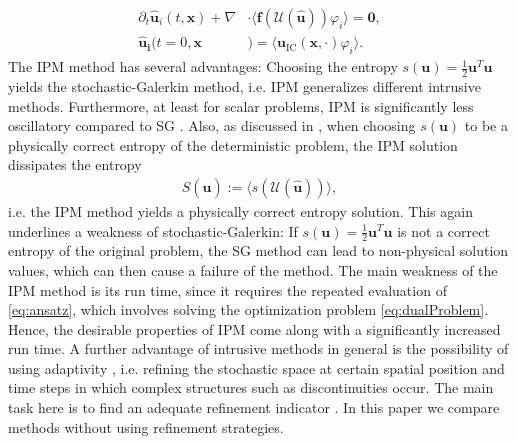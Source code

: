 \begin{subequations}\label{eq:IPMmomentSystem}
\begin{align}
\partial_t \bm{\hat u}_i(t,\bm{x}) + \nabla&\cdot\langle\bm{f}(\mathcal{U}(\bm{\hat u})) \varphi_i\rangle = \bm{0}, \\
\bm{\hat u_i}(t=0,\bm{x}&) = \langle\bm{u}_{\text{IC}}(\bm{x},\cdot)\varphi_i\rangle.
\end{align}
\end{subequations}
The IPM method has several advantages: Choosing the entropy $s(\bm{u}) = \frac{1}{2}\bm{u}^T\bm{u}$ yields the stochastic-Galerkin method, i.e. IPM generalizes different intrusive methods. Furthermore, at least for scalar problems, IPM is significantly less oscillatory compared to SG \cite{kusch2017maximum}. Also, as discussed in \cite{poette2009uncertainty}, when choosing $s(\bm u)$ to be a physically correct entropy of the deterministic problem, the IPM solution dissipates the entropy
\begin{align*}
S(\bm{\hat u}) := \langle s( \mathcal{U}(\bm{\hat u}))\rangle,
\end{align*}
i.e. the IPM method yields a physically correct entropy solution. This again underlines a weakness of stochastic-Galerkin: If $s(\bm{u}) = \frac{1}{2}\bm{u}^T\bm{u}$ is not a correct entropy of the original problem, the SG method can lead to non-physical solution values, which can then cause a failure of the method. The main weakness of the IPM method is its run time, since it requires the repeated evaluation of \eqref{eq:ansatz}, which involves solving the optimization problem \eqref{eq:dualProblem}. Hence, the desirable properties of IPM come along with a significantly increased run time. A further advantage of intrusive methods in general is the possibility of using adaptivity \cite{kroker2012finite,kusch2018filtered}, i.e. refining the stochastic space at certain spatial position and time steps in which complex structures such as discontinuities occur. The main task here is to find an adequate refinement indicator \cite{kroker2012finite,giesselmann2017posteriori}. In this paper we compare methods without using refinement strategies.\\

